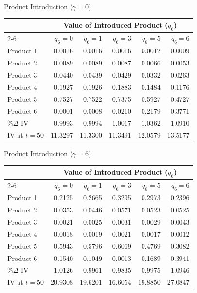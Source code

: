 \documentclass[aspectratio=169,professionalfonts]{beamer}
\begin{document}
\begin{frame}{Product Introduction ($\gamma = 0$)}
\begin{center}
\scriptsize
\setlength{\tabcolsep}{5pt}
\begin{tabular}{lrrrrr}
  \toprule
  & \multicolumn{5}{c}{Value of Introduced Product ($q_6$)} \\
  \cmidrule(lr){2-6}
  & $q_6=0$ & $q_6=1$ & $q_6=3$ & $q_6=5$ & $q_6=6$ \\
  \midrule
  Product 1        & 0.0016  & 0.0016  & 0.0016  & 0.0012  & 0.0009  \\
  Product 2        & 0.0089  & 0.0089  & 0.0087  & 0.0066  & 0.0053  \\
  Product 3        & 0.0440  & 0.0439  & 0.0429  & 0.0332  & 0.0263  \\
  Product 4        & 0.1927  & 0.1926  & 0.1883  & 0.1484  & 0.1176  \\
  Product 5        & 0.7527  & 0.7522  & 0.7375  & 0.5927  & 0.4727  \\
  Product 6        & 0.0001  & 0.0008  & 0.0210  & 0.2179  & 0.3771  \\
  \midrule
  $\%\Delta$ IV    & 0.9993  & 0.9994  & 1.0017  & 1.0362  & 1.0910  \\
  IV at $t=50$     & 11.3297 & 11.3300 & 11.3491 & 12.0579 & 13.5177 \\
  \bottomrule
\end{tabular}
\end{center}
\end{frame}

\begin{frame}{Product Introduction ($\gamma = 6$)}
\begin{center}
\scriptsize
\setlength{\tabcolsep}{5pt}
\begin{tabular}{lrrrrr}
  \toprule
  & \multicolumn{5}{c}{Value of Introduced Product ($q_6$)} \\
  \cmidrule(lr){2-6}
  & $q_6=0$ & $q_6=1$ & $q_6=3$ & $q_6=5$ & $q_6=6$ \\
  \midrule
  Product 1        & 0.2125  & 0.2665  & 0.3295  & 0.2973  & 0.2396  \\
  Product 2        & 0.0353  & 0.0446  & 0.0571  & 0.0523  & 0.0525  \\
  Product 3        & 0.0021  & 0.0025  & 0.0031  & 0.0029  & 0.0043  \\
  Product 4        & 0.0018  & 0.0019  & 0.0021  & 0.0017  & 0.0012  \\
  Product 5        & 0.5943  & 0.5796  & 0.6069  & 0.4769  & 0.3082  \\
  Product 6        & 0.1540  & 0.1049  & 0.0013  & 0.1689  & 0.3941  \\
  \midrule
  $\%\Delta$ IV    & 1.0126  & 0.9961  & 0.9835  & 0.9975  & 1.0946  \\
  IV at $t=50$     & 20.9308 & 19.6201 & 16.6054 & 19.8850 & 27.0847 \\
  \bottomrule
\end{tabular}
\end{center}
\end{frame}
\end{document}
